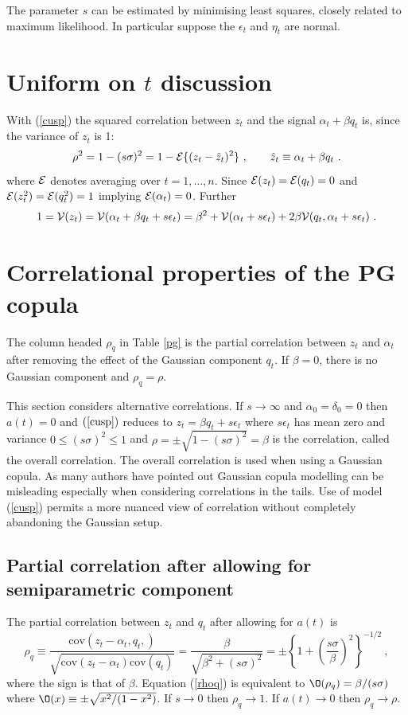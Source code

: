 \documentclass[authoryear]{elsarticle}
\newcommand{\cov}{\mathrm{cov}}
\newcommand{\eps}{\epsilon}
\newcommand{\Ex}{{\cal E}}
\newcommand{\eref}[1]{(\ref{#1})}
\newcommand{\tref}[1]{Table \ref{#1}}
\newcommand{\cq}{\ , \qquad}
\newcommand{\Vx}{{\cal V}}
\newcommand{\be}[1]{\begin{equation}\label{#1}}
\newcommand{\ee}{\end{equation}}
\begin{document}
 The parameter $s$ can be estimated by minimising least squares,  closely related to maximum likelihood.    In particular suppose the $\eps_t$ and $\eta_t$ are normal.  
 
\section{Uniform on $t$ discussion}

With \eref{cusp} the squared correlation between $z_t$ and the signal $\alpha_t+\beta q_t$ is, since the variance of $z_t$ is 1:
 $$
 \rho^2=1-(s\sigma)^2 = 1- \Ex\{(z_t-\hat z_t)^2\}\cq \hat z_t\equiv\alpha_t+\beta q_t\ .
 $$
 where $\Ex$ denotes averaging over $t=1,\ldots,n$.  Since $\Ex(z_t)=\Ex(q_t)=0$ and $\Ex(z_t^2)=\Ex(q_t^2)=1$ implying
 $\Ex(\alpha_t)=0$.  Further
 $$
 1=\Vx(z_t) = \Vx(\alpha_t+\beta q_t + s\eps_t) = \beta^2 + \Vx(\alpha_t+s\eps_t) + 2\beta\Vx(q_t,\alpha_t+s\eps_t)\ .
 $$
 
 \section{Correlational properties of the PG copula}
 
 The column headed $\rho_q$ in \tref{pg} is the partial correlation between $z_t$ and $\alpha_t$ after removing the effect of the Gaussian component $q_t$.  If $\beta=0$, there is no Gaussian component and $\rho_q=\rho$.
 
 This section considers alternative correlations.   If $s\rightarrow\infty$ and $\alpha_0=\delta_0=0$ then $a(t)=0$ and $\eref{cusp}$ reduces to $z_t=\beta q_t+s\eps_t$ where $s\eps_t$ has mean zero and variance $0\le (s\sigma)^2\le 1$ and $\rho=\pm\sqrt{1-(s\sigma)^2}=\beta$ is the correlation, called the overall correlation.  The overall correlation is used when using a Gaussian copula.
As many authors have pointed out Gaussian copula modelling can be misleading especially when considering correlations in the tails.
Use of model \eref{cusp} permits a more nuanced view of correlation without completely abandoning the Gaussian setup.

\subsection{Partial correlation after allowing for semiparametric component}
  The partial correlation between $z_t$ and $q_t$ after allowing for $a(t)$ is
\be{rhoq}
\rho_q\equiv\frac{\cov(z_t-\alpha_t,q_t,)}{\sqrt{\cov(z_t-\alpha_t)\cov(q_t)}} = \frac{\beta}{\sqrt{\beta^2+(s\sigma)^2}}=\pm\left\{1+\left(\frac{s\sigma}{\beta}\right)^2\right\}^{-1/2}\ ,
\ee
where the sign is that of $\beta$.  Equation \eref{rhoq} is equivalent to  
$
\O(\rho_q) =\beta/(s\sigma)
$
where $\O(x) \equiv \pm\sqrt{x^2/(1-x^2)}$.  If $s\rightarrow 0$ then $\rho_q\rightarrow 1$.
If $a(t)\rightarrow 0$ then  $\rho_q\rightarrow\rho$.  
\end{document}
